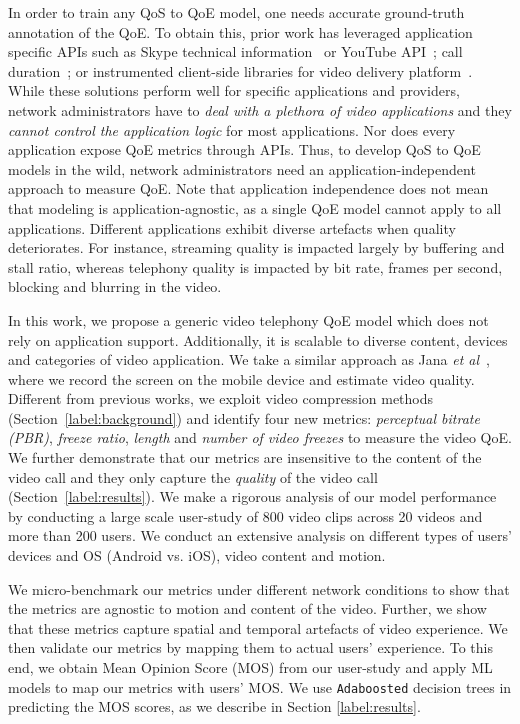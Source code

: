 In order to train any QoS to QoE model, one needs accurate ground-truth annotation of the QoE. To obtain this, prior work has leveraged application specific APIs such as Skype technical information~\cite{zhang2012profiling} or YouTube API~\cite{aggarwal2014prometheus}; call duration~\cite{chen2006quantifying}; or instrumented client-side libraries for video delivery platform~\cite{balachandran2013developing}. While these solutions perform well for specific applications and providers, network administrators have to \emph{deal with a plethora of video applications} and they \emph{cannot control the application logic} for most applications. Nor does every application expose QoE metrics through APIs. 
Thus, to develop QoS to QoE models in the wild, network administrators need an application-independent approach to measure QoE. Note that application independence does not mean that modeling is application-agnostic, as a single QoE model cannot apply to all applications. Different applications exhibit diverse artefacts when quality deteriorates. For instance, streaming quality is impacted largely by buffering and stall ratio, whereas telephony quality is impacted by bit rate, frames per second, blocking and blurring in the video.

In this work, we propose a generic video telephony QoE model which does not rely on application support. Additionally, it is scalable to diverse content, devices and categories of video application. We take a similar approach as Jana {\em et al}~\cite{jana2016qoe}, where we record the screen on the mobile device and estimate video quality. Different from previous works, we exploit video compression methods (Section~\ref{label:background}) and identify four new metrics: {\em perceptual bitrate (PBR)}, {\em freeze ratio}, {\em length} and {\em number of video freezes} to measure 
the video QoE. We further demonstrate that our metrics are insensitive to the content of the video call and they only capture the {\em quality} of the video call (Section~\ref{label:results}). We make a rigorous analysis of our model performance by conducting a large scale user-study of 800 video clips across 20 videos and more than 200 users. We conduct an extensive analysis on different types of users' devices and OS (Android vs. iOS), video content and motion.  

We micro-benchmark our metrics under different network conditions to show that the metrics are agnostic to motion and content of the video.
Further, we show that these metrics capture spatial and temporal artefacts of video experience.
We then validate our metrics by mapping them to actual users' experience. To this end, we obtain Mean Opinion Score (MOS) from our user-study and apply ML models to map our metrics with users' MOS.
We use \texttt{Adaboosted} decision trees in predicting the MOS scores, as we describe in Section \ref{label:results}.

